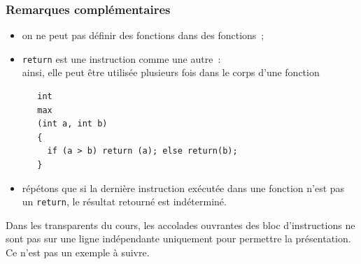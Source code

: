 \begin{frame}[fragile]
  \frametitle{Remarques compl\'ementaires}
  \begin{itemize}
  \item on ne peut  pas d\'efinir des fonctions dans des fonctions~;
  \item {\tt return} est une instruction comme une autre~: \\
    \quad  ainsi, elle peut \^etre utilis\'ee plusieurs fois dans le corps d'une fonction
\begin{verbatim}
   int 
   max
   (int a, int b) 
   {
     if (a > b) return (a); else return(b);
   }
\end{verbatim}
  \item r\'ep\'etons que si la derni\`ere instruction ex\'ecut\'ee
    dans une fonction n'est pas un {\tt return}, le r\'esultat
    retourn\'e est ind\'etermin\'e.
  \end{itemize}
  Dans les transparents du cours, les accolades ouvrantes des bloc
  d'instructions ne sont pas sur une ligne ind\'ependante uniquement
  pour permettre la pr\'esentation. Ce n'est pas un exemple \`a
  suivre.
\end{frame}
